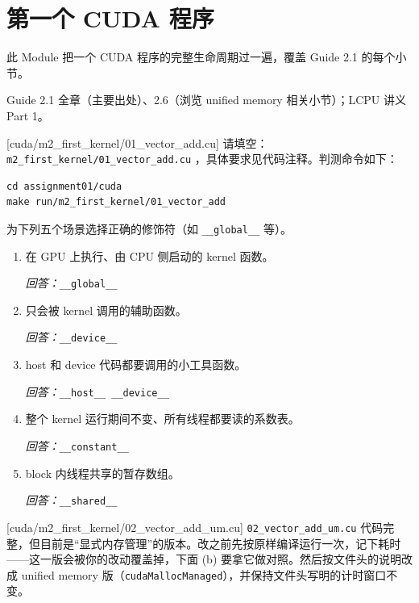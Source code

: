 \documentclass[11pt,a4paper,fontset=none]{ctexart}
\begin{document}
\section{第一个 CUDA 程序}

此 Module 把一个 CUDA 程序的完整生命周期过一遍，覆盖 Guide 2.1 的每个小节。

\begin{reading}
Guide 2.1 全章（主要出处）、2.6（浏览 unified memory 相关小节）；LCPU 讲义 Part 1。
\end{reading}

[cuda/m2\_first\_kernel/01\_vector\_add.cu]
请填空：\texttt{m2\_first\_kernel/01\_vector\_add.cu} ，具体要求见代码注释。判测命令如下：

\begin{lstlisting}
cd assignment01/cuda
make run/m2_first_kernel/01_vector_add
\end{lstlisting}

为下列五个场景选择正确的修饰符（如 \texttt{\_\_global\_\_} 等）。
\begin{enumerate}[label=(\alph*)]
  \item 在 GPU 上执行、由 CPU 侧启动的 kernel 函数。
  \par\noindent\textit{回答：}\texttt{\_\_global\_\_}
  \item 只会被 kernel 调用的辅助函数。
  \par\noindent\textit{回答：}\texttt{\_\_device\_\_}
  \item host 和 device 代码都要调用的小工具函数。
  \par\noindent\textit{回答：}\texttt{\_\_host\_\_ \_\_device\_\_}
  \item 整个 kernel 运行期间不变、所有线程都要读的系数表。
  \par\noindent\textit{回答：}\texttt{\_\_constant\_\_}
  \item block 内线程共享的暂存数组。
  \par\noindent\textit{回答：}\texttt{\_\_shared\_\_}
\end{enumerate}

[cuda/m2\_first\_kernel/02\_vector\_add\_um.cu]
\texttt{02\_vector\_add\_um.cu} 代码完整，但目前是“显式内存管理”的版本。改之前先按原样编译运行一次，记下耗时——这一版会被你的改动覆盖掉，下面 (b) 要拿它做对照。然后按文件头的说明改成 unified memory 版（\texttt{cudaMallocManaged}），并保持文件头写明的计时窗口不变。
\end{document}
